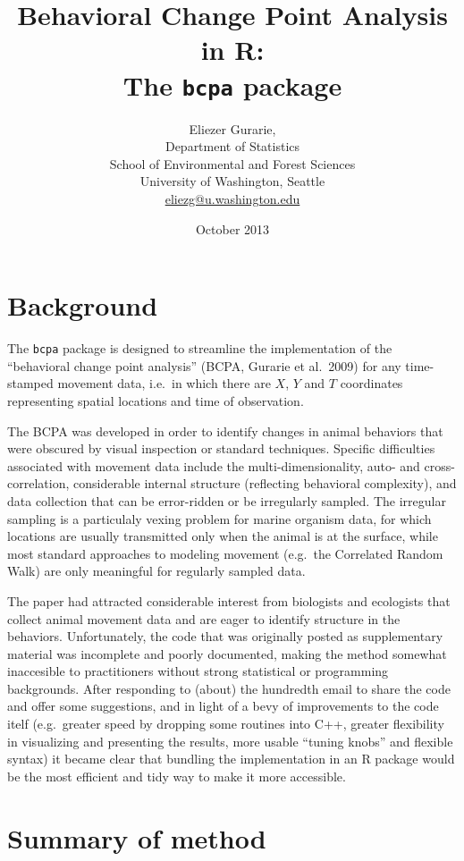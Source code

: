 \documentclass[10pt]{article}\usepackage[]{graphicx}\usepackage[]{color}
\title{Behavioral Change Point Analysis in R:\\
The {\tt bcpa} package}
\author{Eliezer Gurarie,\\
Department of Statistics\\
School of Environmental and Forest Sciences\\
University of Washington, Seattle\\
\url{eliezg@u.washington.edu}}
\date{October 2013}
\begin{document}
\maketitle
\begin{spacing}{0.1}
\tableofcontents
\end{spacing}
\section{Background}

The \texttt{bcpa} package is designed to streamline the implementation of the ``behavioral change point analysis'' (BCPA, Gurarie et al.~2009) for any time-stamped movement data, i.e.~in which there are $X$, $Y$ and $T$ coordinates representing spatial locations and time of observation. 

The BCPA was developed in order to identify changes in animal behaviors that were obscured by visual inspection or standard techniques. Specific difficulties associated with movement data include the multi-dimensionality, auto- and cross-correlation, considerable internal structure (reflecting behavioral complexity), and data collection that can be error-ridden or be irregularly sampled.  The irregular sampling is a particulaly vexing problem for marine organism data, for which locations are usually transmitted only when the animal is at the surface, while most standard approaches to modeling movement (e.g.~the Correlated Random Walk) are only meaningful for regularly sampled data. 

The paper had attracted considerable interest from biologists and ecologists that collect animal movement data and are eager to identify structure in the behaviors.  Unfortunately, the code that was originally posted as supplementary material was incomplete and poorly documented, making the method somewhat inaccesible to practitioners without strong statistical or programming backgrounds.  After responding to (about) the hundredth email to share the code and offer some suggestions, and in light of a bevy of improvements to the code itelf (e.g.~greater speed by dropping some routines into C++, greater flexibility in visualizing and presenting the results, more usable ``tuning knobs'' and flexible syntax) it became clear that bundling the implementation in an R package would be the most efficient and tidy way to make it more accessible.  

  
\section{Summary of method}
\end{document}
